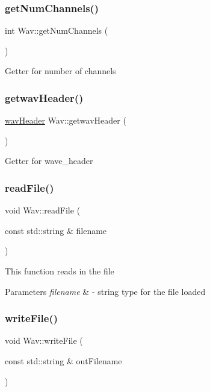 \subsubsection{\texorpdfstring{get\+Num\+Channels()}{getNumChannels()}}
{\footnotesize\ttfamily int Wav\+::get\+Num\+Channels (\begin{DoxyParamCaption}{ }\end{DoxyParamCaption})}

Getter for number of channels \mbox{\label{classWav_a5e521ff6da3e7a3ed546d948a125847f}} 
\subsubsection{\texorpdfstring{getwav\+Header()}{getwavHeader()}}
{\footnotesize\ttfamily \hyperlink{structwavHeader}{wav\+Header} Wav\+::getwav\+Header (\begin{DoxyParamCaption}{ }\end{DoxyParamCaption})}

Getter for wave\+\_\+header \mbox{\label{classWav_a8dbfa6c6dc4d8a0df92b0e4cb49d0133}} 
\subsubsection{\texorpdfstring{read\+File()}{readFile()}}
{\footnotesize\ttfamily void Wav\+::read\+File (\begin{DoxyParamCaption}\item[{const std\+::string \&}]{filename }\end{DoxyParamCaption})}

This function reads in the file 
\begin{DoxyParams}{Parameters}
{\em filename} & -\/ string type for the file loaded \\
\hline
\end{DoxyParams}
\mbox{\label{classWav_a3e4d48579d4c83afb0519ac8492af6d0}} 
\subsubsection{\texorpdfstring{write\+File()}{writeFile()}}
{\footnotesize\ttfamily void Wav\+::write\+File (\begin{DoxyParamCaption}\item[{const std\+::string \&}]{out\+Filename }\end{DoxyParamCaption})}

